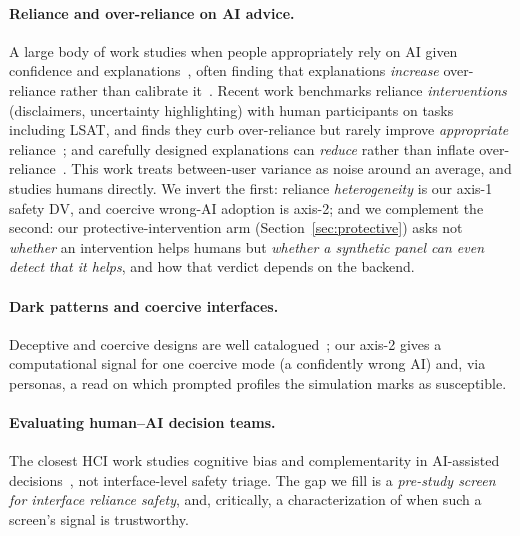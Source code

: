\documentclass[manuscript,nonacm]{acmart}
\begin{document}
\paragraph{Reliance and over-reliance on AI advice.} A large body of work studies when people
appropriately rely on AI given confidence and
explanations~\cite{bansal2021whole,bucinca2021trust,zhang2020confidence,lai2019human,schemmer2023appropriate},
often finding that explanations \emph{increase} over-reliance rather than calibrate
it~\cite{bansal2021whole}. Recent work benchmarks reliance
\emph{interventions} (disclaimers, uncertainty highlighting) with human participants on tasks including
LSAT, and finds they curb over-reliance but rarely improve \emph{appropriate}
reliance~\cite{bo2024rely}; and carefully designed explanations can \emph{reduce} rather than inflate
over-reliance~\cite{vasconcelos2023explanations}. This work treats between-user variance as noise
around an average, and studies humans directly. We invert the first: reliance \emph{heterogeneity} is our
axis-1 safety DV, and coercive wrong-AI adoption is axis-2; and we complement the second: our
protective-intervention arm (Section~\ref{sec:protective}) asks not \emph{whether} an intervention helps
humans but \emph{whether a synthetic panel can even detect that it helps}, and how that verdict depends on
the backend.

\paragraph{Dark patterns and coercive interfaces.} Deceptive and coercive designs are well
catalogued~\cite{luguri2021shining,mildner2023dark}; our axis-2 gives a computational signal for one
coercive mode (a confidently wrong AI) and, via personas, a read on which prompted profiles the
simulation marks as susceptible.

\paragraph{Evaluating human--AI decision teams.} The closest HCI work studies cognitive bias and
complementarity in AI-assisted decisions~\cite{rastogi2022deciding}, not interface-level safety triage. The gap we fill is a \emph{pre-study screen for interface reliance safety},
and, critically, a characterization of when such a screen's signal is trustworthy.
\end{document}
